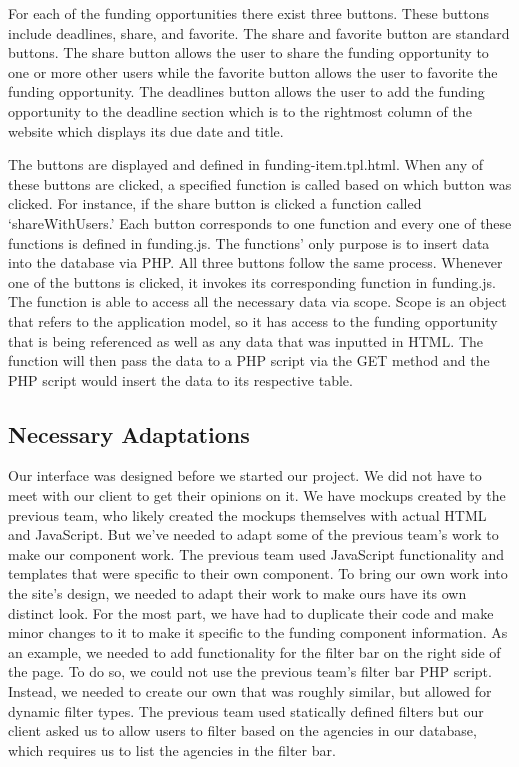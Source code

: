 \documentclass[onecolumn]{IEEEtran}
\begin{document}
For each of the funding opportunities there exist three buttons. These buttons include deadlines, share, and favorite. The share and favorite button are standard buttons. The share button allows the user to share the funding opportunity to one or more other users while the favorite button allows the user to favorite the funding opportunity. The deadlines button allows the user to add the funding opportunity to the deadline section which is to the rightmost column of the website which displays its due date and title. 

The buttons are displayed and defined in funding-item.tpl.html. When any of these buttons are clicked, a specified function is called based on which button was clicked. For instance, if the share button is clicked a function called `shareWithUsers.' Each button corresponds to one function and every one of these functions is defined in funding.js. The functions' only purpose is to insert data into the database via PHP. All three buttons follow the same process. Whenever one of the buttons is clicked, it invokes its corresponding function in funding.js. The function is able to access all the necessary data via scope. Scope is an object that refers to the application model, so it has access to the funding opportunity that is being referenced as well as any data that was inputted in HTML. The function will then pass the data to a PHP script via the GET method and the PHP script would insert the data to its respective table. 

\subsection{Necessary Adaptations}
Our interface was designed before we started our project. We did not have to meet with our client to get their opinions on it. We have mockups created by the previous team, who likely created the mockups themselves with actual HTML and JavaScript. But we've needed to adapt some of the previous team's work to make our component work. The previous team used JavaScript functionality and templates that were specific to their own component. To bring our own work into the site's design, we needed to adapt their work to make ours have its own distinct look. For the most part, we have had to duplicate their code and make minor changes to it to make it specific to the funding component information. As an example, we needed to add functionality for the filter bar on the right side of the page. To do so, we could not use the previous team's filter bar PHP script. Instead, we needed to create our own that was roughly similar, but allowed for dynamic filter types. The previous team used statically defined filters but our client asked us to allow users to filter based on the agencies in our database, which requires us to list the agencies in the filter bar.
\end{document}
